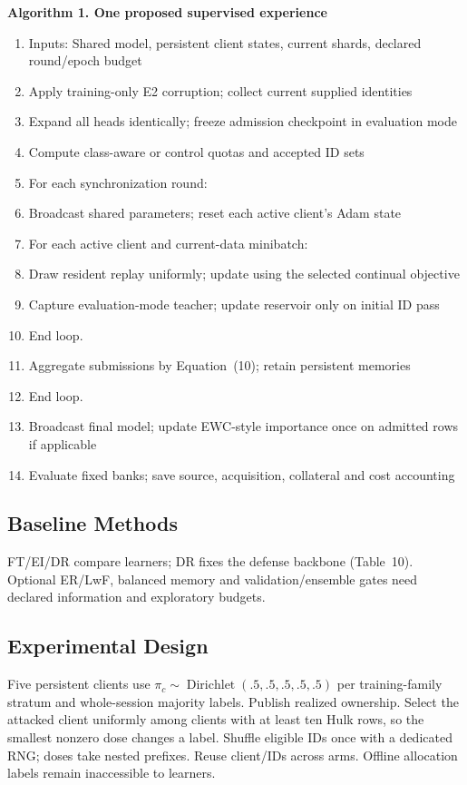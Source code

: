 \documentclass[10pt,a4paper]{article}
\begin{document}
\par\textbf{Algorithm 1. One proposed supervised experience}\par
\begin{enumerate}
\item Inputs: Shared model, persistent client states, current shards, declared round/epoch budget
\item Apply training-only E2 corruption; collect current supplied identities
\item Expand all heads identically; freeze admission checkpoint in evaluation mode
\item Compute class-aware or control quotas and accepted ID sets
\item For each synchronization round:
\item Broadcast shared parameters; reset each active client's Adam state
\item For each active client and current-data minibatch:
\item Draw resident replay uniformly; update using the selected continual objective
\item Capture evaluation-mode teacher; update reservoir only on initial ID pass
\item End loop.
\item Aggregate submissions by Equation~(10); retain persistent memories
\item End loop.
\item Broadcast final model; update EWC-style importance once on admitted rows if applicable
\item Evaluate fixed banks; save source, acquisition, collateral and cost accounting
\end{enumerate}
\subsection{Baseline Methods}
FT/EI/DR compare learners; DR fixes the defense backbone (Table~10). Optional ER/LwF, balanced memory and validation/ensemble gates need declared information and exploratory budgets.

\subsection{Experimental Design}
Five persistent clients use $\pi_c\sim\operatorname{Dirichlet}(.5,.5,.5,.5,.5)$ per training-family stratum and whole-session majority labels. Publish realized ownership. Select the attacked client uniformly among clients with at least ten Hulk rows, so the smallest nonzero dose changes a label. Shuffle eligible IDs once with a dedicated RNG; doses take nested prefixes. Reuse client/IDs across arms. Offline allocation labels remain inaccessible to learners.
\end{document}
